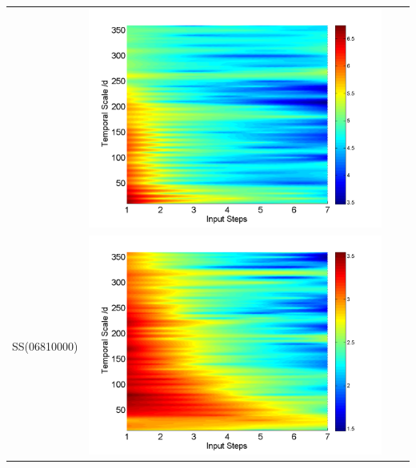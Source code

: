 \documentclass[review]{elsarticle}
\begin{document}
\begin{table}[H]
\begin{tabular}{cccc}
&\begin{minipage}{.3\textwidth}\includegraphics[width=\linewidth]{resultgraph/11532500pepq_rela.png}\end{minipage}
\\
SS(06810000)
&\begin{minipage}{.3\textwidth}\includegraphics[width=\linewidth]{resultgraph/06810000p_rela.png}\end{minipage}

\end{tabular}
\end{table}
\end{document}
